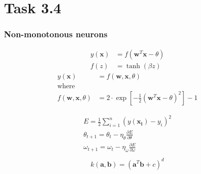 \documentclass{beamer}
\begin{document}
\section{Task 3.4}

\begin{frame}
	\frametitle{Non-monotonous neurons}
	\begin{align*}
		y(\mathbf{x}) &= f(\mathbf{w}^T\mathbf{x}-\theta)\\
		f(z) &= \tanh(\beta z)
	\end{align*}
	\begin{align*}
		y(\mathbf{x})&= f(\mathbf{w},\mathbf{x},\theta)\\
		\text{where }\\
		f(\mathbf{w},\mathbf{x},\theta) &= 2\cdot\exp\left[-\frac{1}{2}(\mathbf{w}^T\mathbf{x}-\theta)^2\right]-1
	\end{align*}
\end{frame}
\begin{frame}
	\begin{align*}
	E = \frac{1}{2}\sum_{i=1}^{n}(y(\mathbf{x_i})-y_i)^2\\
	\theta_{t+1} = \theta_{t} - \eta_\theta \frac{\partial E}{\partial \theta}\\
	\omega_{t+1} = \omega_{t} - \eta_\omega \frac{\partial E}{\partial \omega}\\
	\end{align*}
	\begin{align*}
		k(\mathbf{a},\mathbf{b}) = (\mathbf{a}^T\mathbf{b}+c)^d
	\end{align*}
\end{frame}
\end{document}

